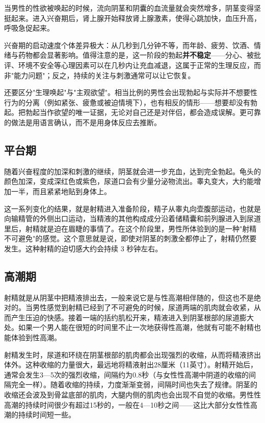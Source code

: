 \documentclass[12pt,a4paper,twoside]{ctexbook}
\begin{document}
当男性的性欲被唤起的时候，流向阴茎和阴囊的血流量就会突然增多，阴茎变得坚挺起来。进入兴奋期后，肾上腺开始释放肾上腺激素，使得心跳加快，血压升高，呼吸急促起来。


兴奋期的启动速度个体差异极大：从几秒到几分钟不等，而年龄、疲劳、饮酒、情绪与药物都会显著影响。值得注意的是，这一阶段的勃起\textbf{并不稳定}——分心、被批评、环境不安全等心理因素可以在几秒内让充血减退，这属于正常的生理反应，而非"能力问题"；反之，持续的关注与刺激通常可以让它恢复。

还要区分"生理唤起"与"主观欲望"。相当比例的男性会出现勃起与实际并不想要性行为的分离（例如紧张、疲惫或被迫情境下），也有相反的情形——想要却没有勃起。把勃起当作欲望的唯一证据，无论对自己还是对伴侣，都会造成误解。更可靠的做法是用语言确认，而不是用身体反应去推断。

\subsection{平台期}

随着兴奋程度的加深和刺激的继续，阴茎就会进一步充血，达到完全勃起。龟头的颜色加深，变成深红色或紫色，尿道口会有少量分泌物流出。睾丸变大，大约能增加一半，而且紧紧地贴到身体上。

这一系列变化的结果，就是射精进入准备阶段，精子从睾丸向壶腹部运动，也就是向输精管的外侧出口运动，当精液的其他构成成分沿着储精囊和前列腺进入到尿道里后，射精就是迫在眉睫的事情了。在这个阶段里，男性所体验到的是一种"射精不可避免"的感觉。这个意思就是说，即使对阴茎的刺激全都停止了，射精仍然要发生。这种射精的迫切感大约会持续 3 秒钟左右。

\subsection{高潮期}

射精就是从阴茎中把精液排出去，一般来说它是与性高潮相伴随的，但这也不是绝对的。当男性感觉到射精已经到了不可避免的时候，尿道两端的肌肉就会收紧，从而产生压迫的快感。接着一端的括约肌松开来，精液进入到阴茎根部的尿道膨大处。如果一个男人能在很短的时间里不止一次地获得性高潮，他就有可能不射精也能体验到性高潮。

射精发生时，尿道和环绕在阴茎根部的肌肉都会出现强烈的收缩，从而将精液挤出体外。这种收缩的力量很大，最远地将精液射出28厘米（11英寸）。射精开始后，通常会发生3—5次的强烈收缩，间隔约为0.8秒（与女性性高潮中阴道的收缩的间隔完全一样）。随着收缩的持续，力度渐渐变弱，间隔时间也失去了规律。阴茎的收缩还会波及到骨盆底部的肌肉，大腿内侧的肌肉也会出现不自觉的收缩。男性性高潮的持续时间很少有超过15秒的，一般在4—10秒之间——这比大部分女性性高潮的持续时间短一些。
\end{document}
